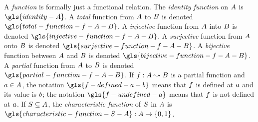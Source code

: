 
A \emph{function} is formally just a functional relation. The \emph{identity
function} on $A$ is $\gls{identity-A}$.
A \emph{total} function from $A$ to $B$ is denoted
$\gls{total-function-f-A-B}$.
A \emph{injective} function from $A$ into $B$ is denoted
$\gls{injective-function-f-A-B}$.
A \emph{surjective} function from $A$ onto $B$ is denoted
$\gls{surjective-function-f-A-B}$.
A \emph{bijective} function between $A$ and $B$ is denoted
$\gls{bijective-function-f-A-B}$.
A \emph{partial} function from $A$ to $B$ is denoted
$\gls{partial-function-f-A-B}$. If $f : A \leadsto B$ is a partial
function and $a \in A$, the notation $\gls{f-defined-a-b}$ means that
$f$ is defined at $a$ and its value is $b$;
the notation $\gls{f-undefined-a}$ means that $f$ is not defined at $a$.
If $S \subseteq A$, the \emph{characteristic function} of $S$ in
$A$ is $\gls{characteristic-function-S-A} : \setA \to \set{0,1}$.